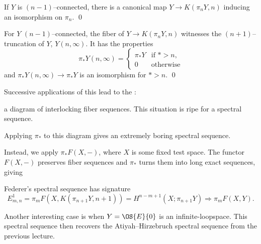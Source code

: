 \begin{corollary}
If $Y$ is $(n-1)$--connected, there is a canonical map $Y \to K(\pi_n Y, n)$ inducing an isomorphism on $\pi_n$. \qed
\end{corollary}

\begin{corollary}
For $Y$ $(n-1)$--connected, the fiber of $Y \to K(\pi_n Y, n)$ witnesses the $(n+1)$--truncation of $Y$, $Y(n, \infty)$.  It has the properties \[\pi_* Y(n, \infty) = \begin{cases} \pi_* Y & \text{if $* > n$}, \\ 0 & \text{otherwise} \end{cases}\] and $\pi_* Y(n, \infty) \to \pi_* Y$ is an isomorphism for $* > n$. \qed
\end{corollary}

Successive applications of this lead to the :
\begin{center}
\end{center}
a diagram of interlocking fiber sequences.  This situation is ripe for a spectral sequence.

\begin{remark}
Applying $\pi_*$ to this diagram gives an extremely boring spectral sequence.
\end{remark}

Instead, we apply $\pi_* F(X, -)$, where $X$ is some fixed test space.  The functor $F(X, -)$ preserves fiber sequences and $\pi_*$ turns them into long exact sequences, giving
\begin{definition}
Federer's spectral sequence has signature \[E^1_{m, n} = \pi_m F(X, K(\pi_{n+1} Y, n+1)) = H^{n-m+1}(X; \pi_{n+1} Y) \Rightarrow \pi_m F(X, Y).\]
\end{definition}

\begin{example}
Another interesting case is when $Y = \OS{E}{0}$ is an infinite-loopspace.  This spectral sequence then recovers the Atiyah--Hirzebruch spectral sequence from the previous lecture.
\end{example}


